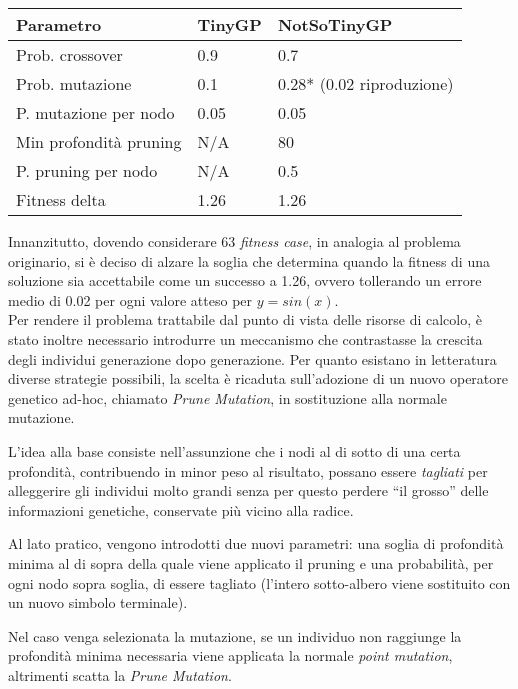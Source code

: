\documentclass{../llncs}
\begin{document}
\begin{table}
\begin{tabular}{l | p{2.7cm} | p{4.3cm}}
\textbf{Parametro}		& \textbf{TinyGP} 	& \textbf{NotSoTinyGP} 		\\ \hline
Prob. crossover 		& 0.9				& 0.7 						\\ \hline
Prob. mutazione			& 0.1 				& 0.28* (0.02 riproduzione) \\ \hline
P. mutazione per nodo 	& 0.05 				& 0.05 						\\ \hline
Min profondità pruning 	& N/A 				& 80 						\\ \hline
P. pruning per nodo 	& N/A 				& 0.5						\\ \hline
Fitness delta 			& 1.26 				& 1.26					 	\\ %
\end{tabular}
\caption{} \label{tableSinParams}
\end{table}

Innanzitutto, dovendo considerare 63 \emph{fitness case}, in analogia al problema originario, si è deciso di alzare la soglia che determina quando la fitness di una soluzione sia accettabile come un successo a 1.26, ovvero tollerando un errore medio di 0.02 per ogni valore atteso per $y=sin(x)$.\\

Per rendere il problema trattabile dal punto di vista delle risorse di calcolo, è stato inoltre necessario introdurre un meccanismo che contrastasse la crescita degli individui generazione dopo generazione. Per quanto esistano in letteratura diverse strategie possibili, la scelta è ricaduta sull'adozione di un nuovo operatore genetico ad-hoc, chiamato \emph{Prune Mutation}, in sostituzione alla normale mutazione.

L'idea alla base consiste nell'assunzione che i nodi al di sotto di una certa profondità, contribuendo in minor peso al risultato, possano essere \emph{tagliati} per alleggerire gli individui molto grandi senza per questo perdere ``il grosso'' delle informazioni genetiche, conservate più vicino alla radice.

Al lato pratico, vengono introdotti due nuovi parametri: una soglia di profondità minima al di sopra della quale viene applicato il pruning e una probabilità, per ogni nodo sopra soglia, di essere tagliato (l'intero sotto-albero viene sostituito con un nuovo simbolo terminale).

Nel caso venga selezionata la mutazione, se un individuo non raggiunge la profondità minima necessaria viene applicata la normale \emph{point mutation}, altrimenti scatta la \emph{Prune Mutation}.\\
\end{document}
